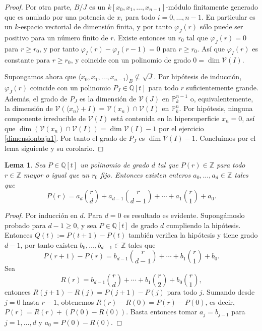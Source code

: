 \documentclass[a4paper,10pt]{book}
\newtheorem{lem}[thm]{Lema}
\newcommand{\PP}{\mathbb P}
\newcommand{\Pnk}{\PP^n_k}
\newcommand{\VV}{{\mathcal V}}
\begin{document}
\begin{proof}
Por otra parte, $B/J$ es un $k[x_0,x_1,\ldots,x_{n-1}]$-módulo finitamente generado que es anulado por una potencia de $x_i$ para todo $i=0,\ldots,n-1$. En particular es un $k$-espacio vectorial de dimensión finita, y por tanto $\varphi_J(r)$ sólo puede ser positivo para un número finito de $r$. Existe entonces un $r_0$ tal que $\varphi_J(r)=0$ para $r\geq r_0$, y por tanto $\varphi_I(r)-\varphi_I(r-1)=0$ para $r\geq r_0$. Así que $\varphi_I(r)$ es constante para $r\geq r_0$, y coincide con un polinomio de grado $0=\dim\VV(I)$.

Supongamos ahora que $\langle x_0,x_1,\ldots,x_{n-1}\rangle_B\not\subseteq \sqrt{J}$. Por hipótesis de inducción, $\varphi_J(r)$ coincide con un polinomio $P_J\in{\mathbb Q}[t]$ para todo $r$ suficientemente grande. Además, el grado de $P_J$ es la dimensión de $\VV(J)$ en $\PP^{n-1}_k$ o, equivalentemente, la dimensión de $\VV(\langle x_n\rangle +I)=\VV(x_n)\cap\VV(I)$ en $\Pnk$. Por hipótesis, ninguna componente irreducible de $\VV(I)$ está contenida en la hipersuperficie $x_n=0$, así que $\dim(\VV(x_n)\cap\VV(I))=\dim\VV(I)-1$ por el ejercicio \ref{dimensionbaja1}. Por tanto el grado de $P_J$ es $\dim\VV(I)-1$. Concluimos por el lema siguiente y su corolario.
\end{proof}

\begin{lem}
 Sea $P\in{\mathbb Q}[t]$ un polinomio de grado $d$ tal que $P(r)\in{\mathbb Z}$ para todo $r\in{\mathbb Z}$ mayor o igual que un $r_0$ fijo. Entonces existen enteros $a_0,\ldots,a_d\in{\mathbb Z}$ tales que
$$
P(r)=a_d{r\choose d}+a_{d-1}{r\choose{d-1}}+\cdots+a_1{r\choose 1}+a_0.
$$
\end{lem}

\begin{proof}
 Por inducción en $d$. Para $d=0$ es resultado es evidente. Supongámoslo probado para $d-1\geq 0$, y sea $P\in{\mathbb Q}[t]$ de grado $d$ cumpliendo la hipótesis. Entonces $Q(t):=P(t+1)-P(t)$ también verifica la hipótesis y tiene grado $d-1$, por tanto existen $b_0,\ldots,b_{d-1}\in{\mathbb Z}$ tales que 
$$
P(r+1)-P(r)=b_{d-1}{r\choose{d-1}}+\cdots+b_1{r\choose 1}+b_0.
$$
Sea
$$
R(r)=b_{d-1}{r\choose{d}}+\cdots+b_1{r\choose 2}+b_0{r\choose 1},
$$
entonces $R(j+1)-R(j)=P(j+1)-P(j)$ para todo $j$. Sumando desde $j=0$ hasta $r-1$, obtenemos $R(r)-R(0)=P(r)-P(0)$, es decir, $P(r)=R(r)+(P(0)-R(0))$. Basta entonces tomar $a_j=b_{j-1}$ para $j=1,\ldots,d$ y $a_0=P(0)-R(0)$.
\end{proof}
\end{document}
